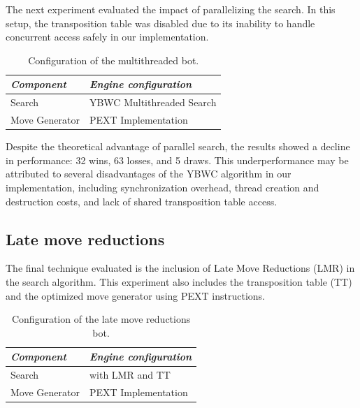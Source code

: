 \noindent The next experiment evaluated the impact of parallelizing the search. In this setup, the transposition table was disabled due to its inability to handle concurrent access safely in our implementation.

\begin{table}[H]
    \centering
    \begin{tabular}{|p{4cm}|p{6cm}|}
    \hline
    \textit{Component}         & \textit{Engine configuration}         \\ \hline
    Search                     & YBWC Multithreaded Search  \\ \hline
    Move Generator             & PEXT Implementation                \\ \hline
    \end{tabular}
    \caption*{Configuration of the multithreaded bot.}
    \label{tab:multithreadedBot}
\end{table}

\begin{center}
\medskip
\end{center}

\noindent Despite the theoretical advantage of parallel search, the results showed a decline in performance: 32 wins, 63 losses, and 5 draws. This underperformance may be attributed to several disadvantages of the YBWC algorithm in our implementation, including synchronization overhead, thread creation and destruction costs, and lack of shared transposition table access.

\subsection*{Late move reductions}

\noindent The final technique evaluated is the inclusion of Late Move Reductions (LMR) in the search algorithm. This experiment also includes the transposition table (TT) and the optimized move generator using PEXT instructions.

\begin{table}[H]
    \centering
    \begin{tabular}{|p{4cm}|p{6cm}|}
    \hline
    \textit{Component}         & \textit{Engine configuration}         \\ \hline
    Search                     & with LMR and TT \\ \hline
    Move Generator             & PEXT Implementation                \\ \hline
    \end{tabular}
    \caption*{Configuration of the late move reductions bot.}
    \label{tab:reductionsBot}
\end{table}

